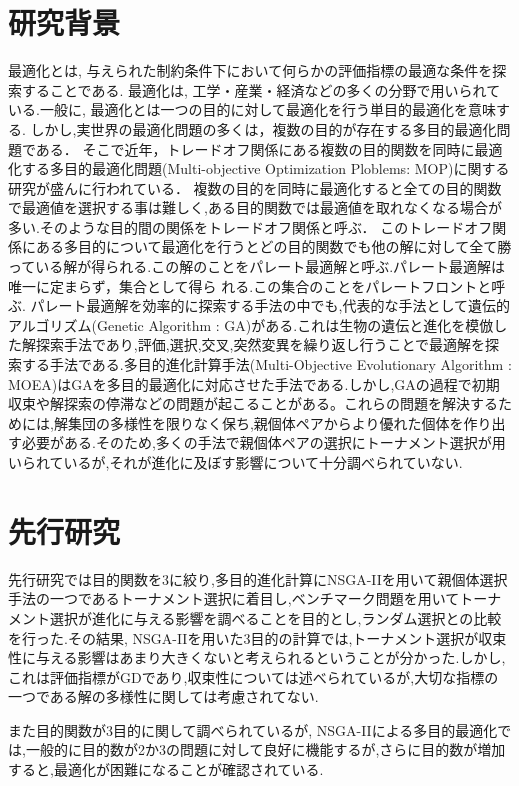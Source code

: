 \documentclass[12pt,a4j,notitlepage]{jreport}
\begin{document}
\section{研究背景}
最適化とは, 与えられた制約条件下において何らかの評価指標の最適な条件を探索することである. 最適化は, 工学・産業・経済などの多くの分野で用いられている.一般に, 最適化とは一つの目的に対して最適化を行う単目的最適化を意味する.
しかし,実世界の最適化問題の多くは，複数の目的が存在する多目的最適化問題である．
そこで近年，トレードオフ関係にある複数の目的関数を同時に最適化する多目的最適化問題(Multi-objective Optimization Ploblems: MOP)に関する研究が盛んに行われている\cite{Li2009}．
複数の目的を同時に最適化すると全ての目的関数で最適値を選択する事は難しく,ある目的関数では最適値を取れなくなる場合が多い.そのような目的間の関係をトレードオフ関係と呼ぶ．
このトレードオフ関係にある多目的について最適化を行うとどの目的関数でも他の解に対して全て勝っている解が得られる.この解のことをパレート最適解と呼ぶ.パレート最適解は唯一に定まらず，集合として得ら れる.この集合のことをパレートフロントと呼ぶ.
パレート最適解を効率的に探索する手法の中でも,代表的な手法として遺伝的アルゴリズム(Genetic Algorithm :  GA)がある.これは生物の遺伝と進化を模倣した解探索手法であり,評価,選択,交叉,突然変異を繰り返し行うことで最適解を探索する手法である.多目的進化計算手法(Multi-Objective Evolutionary Algorithm : MOEA)はGAを多目的最適化に対応させた手法である.しかし,GAの過程で初期収束や解探索の停滞などの問題が起こることがある。これらの問題を解決するためには,解集団の多様性を限りなく保ち,親個体ペアからより優れた個体を作り出す必要がある.そのため,多くの手法で親個体ペアの選択にトーナメント選択が用いられているが,それが進化に及ぼす影響について十分調べられていない.

\section{先行研究}
先行研究では目的関数を3に絞り,多目的進化計算にNSGA-IIを用いて親個体選択手法の一つであるトーナメント選択に着目し,ベンチマーク問題を用いてトーナメント選択が進化に与える影響を調べることを目的とし,ランダム選択との比較を行った.その結果, NSGA-IIを用いた3目的の計算では,トーナメント選択が収束性に与える影響はあまり大きくないと考えられるということが分かった.しかし,これは評価指標がGDであり,収束性については述べられているが,大切な指標の一つである解の多様性に関しては考慮されてない.

また目的関数が3目的に関して調べられているが, NSGA-IIによる多目的最適化では,一般的に目的数が2か3の問題に対して良好に機能するが,さらに目的数が増加すると,最適化が困難になることが確認されている\cite{h.i}.
\end{document}
